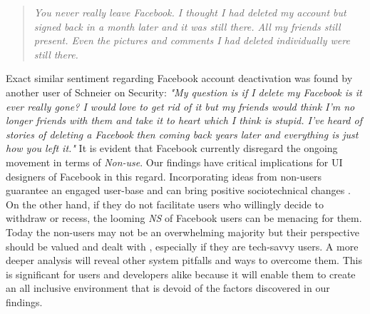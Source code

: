 \begin{quote}
         \textit{You never really leave Facebook. I thought I had deleted my account but signed back in a month later and it was still there. All my friends still present. Even the pictures and comments I had deleted individually were still there.}
    \end{quote}
Exact similar sentiment regarding Facebook account deactivation was found by another user of Schneier on Security: \textit{"My question is if I delete my Facebook is it ever really gone? I would love to get rid of it but my friends would think I'm no longer friends with them and take it to heart which I think is stupid. I've heard of stories of deleting a Facebook then coming back years later and everything is just how you left it."} It is evident that Facebook currently disregard the ongoing movement in terms of \emph{Non-use}. Our findings have critical implications for UI designers of Facebook in this regard. Incorporating ideas from non-users guarantee an engaged user-base and can bring positive sociotechnical changes \cite{baumer2013limiting}. On the other hand, if they do not facilitate users who willingly decide to withdraw or recess, the looming \emph{NS} of Facebook users can be menacing for them. Today the non-users may not be an overwhelming majority but their perspective should be valued and dealt with \cite{wyatt2003non, satchell2009beyond}, especially if they are tech-savvy users. A more deeper analysis will reveal other system pitfalls and ways to overcome them. This is significant for users and developers alike because it will enable them to create an all inclusive environment that is devoid of the factors discovered in our findings.